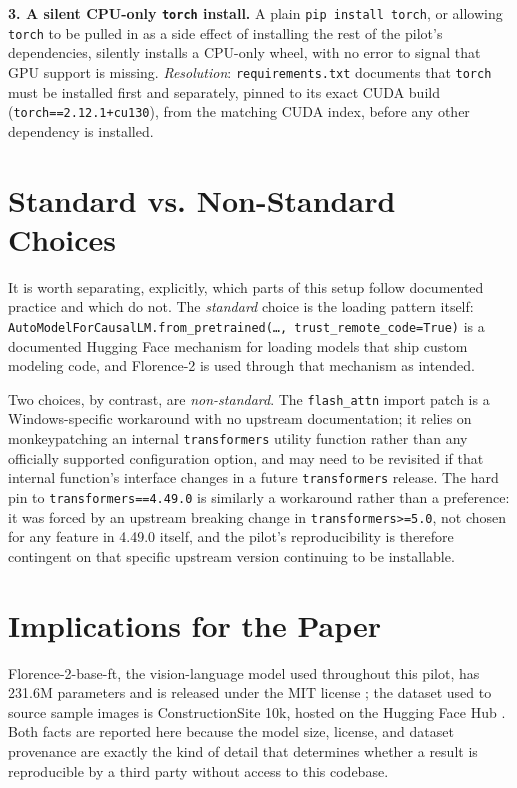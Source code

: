 \textbf{3. A silent CPU-only \texttt{torch} install.} A plain \texttt{pip install torch}, or
allowing \texttt{torch} to be pulled in as a side effect of installing the rest of the pilot's
dependencies, silently installs a CPU-only wheel, with no error to signal that GPU support is
missing. \emph{Resolution}: \texttt{requirements.txt} documents that \texttt{torch} must be
installed first and separately, pinned to its exact CUDA build (\texttt{torch==2.12.1+cu130}),
from the matching CUDA index, before any other dependency is installed.

\section{Standard vs. Non-Standard Choices}

It is worth separating, explicitly, which parts of this setup follow documented practice and which
do not. The \emph{standard} choice is the loading pattern itself:
\texttt{AutoModelForCausalLM.from\_pretrained(\ldots, trust\_remote\_code=True)} is a documented
Hugging Face mechanism for loading models that ship custom modeling code, and Florence-2 is used
through that mechanism as intended.

Two choices, by contrast, are \emph{non-standard}. The \texttt{flash\_attn} import patch is a
Windows-specific workaround with no upstream documentation; it relies on monkeypatching an internal
\texttt{transformers} utility function rather than any officially supported configuration option,
and may need to be revisited if that internal function's interface changes in a future
\texttt{transformers} release. The hard pin to \texttt{transformers==4.49.0} is similarly a
workaround rather than a preference: it was forced by an upstream breaking change in
\texttt{transformers>=5.0}, not chosen for any feature in 4.49.0 itself, and the pilot's
reproducibility is therefore contingent on that specific upstream version continuing to be
installable.

\section{Implications for the Paper}

Florence-2-base-ft, the vision-language model used throughout this pilot, has 231.6M parameters
and is released under the MIT license \citep{xiao2024florence2}; the dataset used to source sample
images is ConstructionSite 10k, hosted on the Hugging Face Hub \citep{constructionsite10k}. Both
facts are reported here because the model size, license, and dataset provenance are exactly the
kind of detail that determines whether a result is reproducible by a third party without access to
this codebase.

